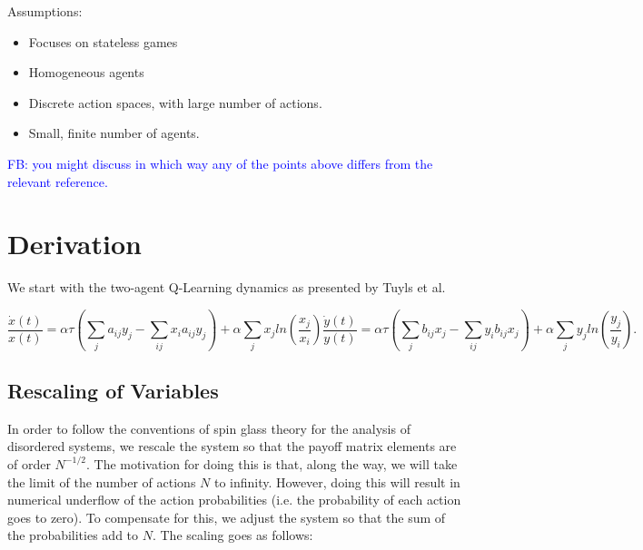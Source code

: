 \documentclass{article}
\newcommand\fb[1]{\textcolor{blue}{FB: #1}}
\begin{document}
	Assumptions:

	\begin{itemize}
		\item Focuses on stateless games
		\item Homogeneous agents
		\item Discrete action spaces, with large number of actions.
		\item Small, finite number of agents.
	\end{itemize}


 \fb{you might discuss in which way any of the points above differs from the relevant reference.}
        
	



	\section{Derivation} %
	\label{sec:derivation}
	
	We start with the two-agent Q-Learning dynamics as presented by Tuyls et al.

	\begin{subequations}
	\label{eqn::EOM}
		\begin{equation}
			\frac{\dot{x}(t)}{x(t)} = \alpha \tau (\sum_{j} a_{ij} y_j - \sum_{i j} x_i a_{ij} y_j)
			+ \alpha \sum_j x_j ln(\frac{x_j}{x_i}) 
		\end{equation}
		\begin{equation}
			\frac{\dot{y}(t)}{y(t)} = \alpha \tau (\sum_{j} b_{ij} x_j - \sum_{i j} y_i b_{ij} x_j)
			+ \alpha \sum_j y_j ln(\frac{y_j}{y_i}).
		\end{equation}
	\end{subequations}

	\subsection{Rescaling of Variables} %
	\label{sub:rescaling_of_variables}
	
		In order to follow the conventions of spin glass theory for the analysis of disordered systems,
	we rescale the system so that the payoff matrix elements are of order $N^{-1/2}$. The motivation
	for doing this is that, along the way, we will take the limit of the number of actions $N$ to
	infinity. However, doing this will result in numerical underflow of the action probabilities 
	(i.e. the probability of each action goes to zero). To compensate for this, we adjust the
	system so that the sum of the probabilities add to $N$. The scaling goes as follows:
\end{document}
